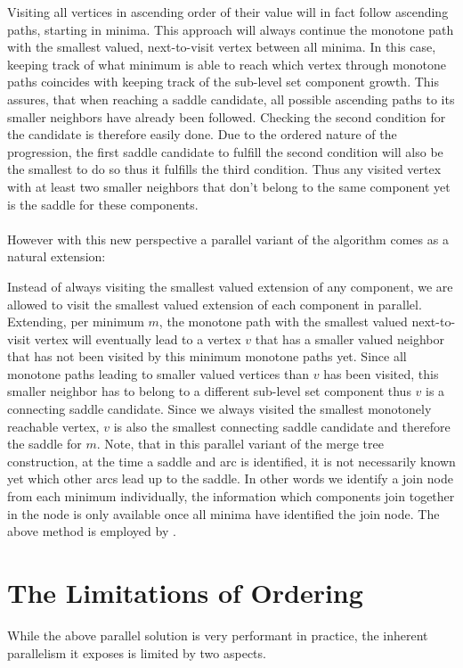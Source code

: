 \documentclass[%
	paper=A4,					%
	twoside=true,				%
	openright,					%
	parskip=full,				%
	chapterprefix=true,			%
	11pt,						%
	headings=normal,			%
	bibliography=totoc,			%
	listof=totoc,				%
	titlepage=on,				%
	captions=tableabove,		%
	draft=false,				%
]{scrreprt}%
\begin{document}
Visiting all vertices in ascending order of their value will in fact follow ascending paths, starting in minima. This approach will always continue the monotone path with the smallest valued, next-to-visit vertex between all minima. In this case, keeping track of what minimum is able to reach which vertex through monotone paths coincides with keeping track of the sub-level set component growth. This assures, that when reaching a saddle candidate, all possible ascending paths to its smaller neighbors have already been followed. Checking the second condition for the candidate is therefore easily done. Due to the ordered nature of the progression, the first saddle candidate to fulfill the second condition will also be the smallest to do so thus it fulfills the third condition. Thus any visited vertex with at least two smaller neighbors that don't belong to the same component yet is the saddle for these components.

\paragraph{}
However with this new perspective a parallel variant of the algorithm comes as a natural extension: 

Instead of always visiting the smallest valued extension of any component, we are allowed to visit the smallest valued extension of each component in parallel. Extending, per minimum \(m\), the monotone path with the smallest valued next-to-visit vertex will eventually lead to a vertex \(v\) that has a smaller valued neighbor that has not been visited by this minimum monotone paths yet. Since all monotone paths leading to smaller valued vertices than \(v\) has been visited, this smaller neighbor has to belong to a different sub-level set component thus \(v\) is a connecting saddle candidate. Since we always visited the smallest monotonely reachable vertex, \(v\) is also the smallest connecting saddle candidate and therefore the saddle for \(m\). Note, that in this parallel variant of the merge tree construction, at the time a saddle and arc is identified, it is not necessarily known yet which other arcs lead up to the saddle. In other words we identify a join node from each minimum individually, the information which components join together in the node is only available once all minima have identified the join node. The above method is employed by \cite{FTM}.

\section{The Limitations of Ordering}
While the above parallel solution is very performant in practice, the inherent parallelism it exposes is limited by two aspects. 
\end{document}
